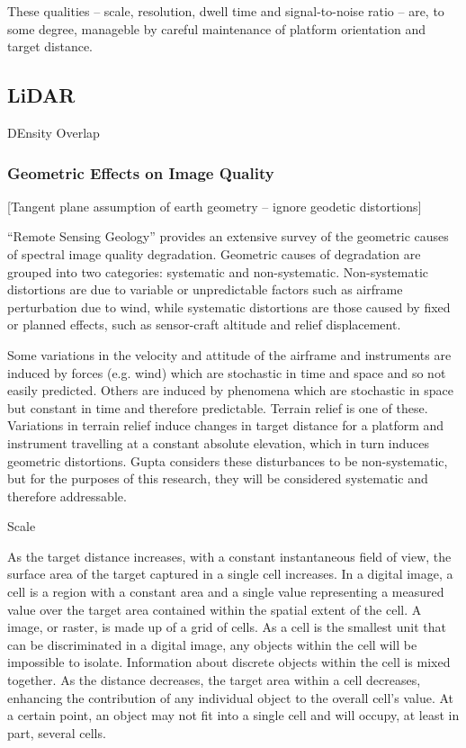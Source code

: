 \documentclass[10pt]{article}
\begin{document}
These qualities -- scale, resolution, dwell time and signal-to-noise ratio -- are, to some degree, manageble by careful maintenance of platform orientation and target distance. 


\subsection{LiDAR}

DEnsity
Overlap


\subsubsection{Geometric Effects on Image Quality}

[Tangent plane assumption of earth geometry -- ignore geodetic distortions]

``Remote Sensing Geology'' \cite{Gupta2018} provides an extensive survey of the geometric causes of spectral image quality degradation. Geometric causes of degradation are grouped into two categories: systematic and non-systematic. Non-systematic distortions are due to variable or unpredictable factors such as airframe perturbation due to wind, while systematic distortions are those caused by fixed or planned effects, such as sensor-craft altitude and relief displacement.

Some variations in the velocity and attitude of the airframe and instruments are induced by forces (e.g. wind) which are stochastic in time and space and so not easily predicted. Others are induced by phenomena which are stochastic in space but constant in time and therefore predictable. Terrain relief is one of these. Variations in terrain relief induce changes in target distance for a platform and instrument travelling at a constant absolute elevation, which in turn induces geometric distortions. Gupta \cite{Gupta2018} considers these disturbances to be non-systematic, but for the purposes of this research, they will be considered systematic and therefore addressable.

Scale

As the target distance increases, with a constant instantaneous field of view, the surface area of the target captured in a single cell increases. In a digital image, a cell is a region with a constant area and a single value representing a measured value over the target area contained within the spatial extent of the cell. A image, or raster, is made up of a grid of cells. As a cell is the smallest unit that can be discriminated in a digital image, any objects within the cell will be impossible to isolate. Information about discrete objects within the cell is mixed together. As the distance decreases, the target area within a cell decreases, enhancing the contribution of any individual object to the overall cell's value. At a certain point, an object may not fit into a single cell and will occupy, at least in part, several cells. 
\end{document}
